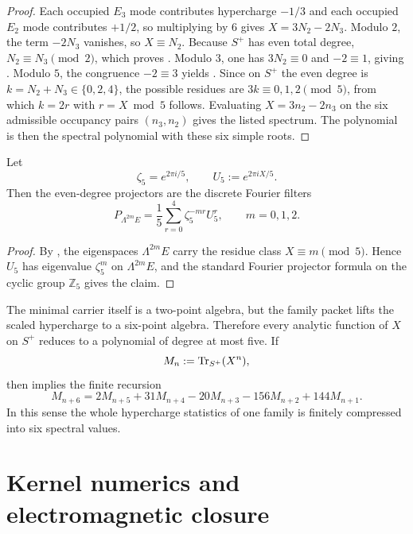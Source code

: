 \begin{proof}
Each occupied $E_3$ mode contributes hypercharge $-1/3$ and each occupied $E_2$ mode contributes $+1/2$, so multiplying by $6$ gives $X=3N_2-2N_3$. Modulo $2$, the term $-2N_3$ vanishes, so $X\equiv N_2$. Because $S^+$ has even total degree, $N_2\equiv N_3\pmod 2$, which proves . Modulo $3$, one has $3N_2\equiv 0$ and $-2\equiv 1$, giving . Modulo $5$, the congruence $-2\equiv 3$ yields . Since on $S^+$ the even degree is $k=N_2+N_3\in\{0,2,4\}$, the possible residues are $3k\equiv 0,1,2\pmod 5$, from which $k=2r$ with $r=X\bmod 5$ follows. Evaluating $X=3n_2-2n_3$ on the six admissible occupancy pairs $(n_3,n_2)$ gives the listed spectrum. The polynomial  is then the spectral polynomial with these six simple roots.
\end{proof}

\begin{corollary}
\label{cor:family-degree-filters}
Let
\[
\zeta_5=e^{2\pi i/5},
\qquad
U_5:=e^{2\pi iX/5}.
\]
Then the even-degree projectors are the discrete Fourier filters
\[
P_{\Lambda^{2m}E}
=
\frac15\sum_{r=0}^{4}\zeta_5^{-mr}U_5^r,
\qquad
m=0,1,2.
\]
\end{corollary}

\begin{proof}
By , the eigenspaces $\Lambda^{2m}E$ carry the residue class $X\equiv m\pmod 5$. Hence $U_5$ has eigenvalue $\zeta_5^m$ on $\Lambda^{2m}E$, and the standard Fourier projector formula on the cyclic group $\mathbb Z_5$ gives the claim.
\end{proof}

\begin{remark}
The minimal carrier itself is a two-point algebra, but the family packet lifts the scaled hypercharge to a six-point algebra. Therefore every analytic function of $X$ on $S^+$ reduces to a polynomial of degree at most five. If
\[
M_n:=\operatorname{Tr}_{S^+}(X^n),
\]
then  implies the finite recursion
\[
M_{n+6}
=
2M_{n+5}+31M_{n+4}-20M_{n+3}-156M_{n+2}+144M_{n+1}.
\]
In this sense the whole hypercharge statistics of one family is finitely compressed into six spectral values.
\end{remark}

\section{Kernel numerics and electromagnetic closure}


